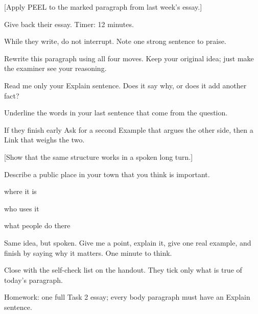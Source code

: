 \documentclass{tutordesk}
\begin{document}
[Apply PEEL to the marked paragraph from last week's essay.]

\begin{action}
  \item Give back their essay. Timer: 12 minutes.
  \item While they write, do not interrupt. Note one strong sentence to praise.
\end{action}

\begin{say}
Rewrite this paragraph using all four moves. Keep your original idea; just make the examiner
see your reasoning.
\end{say}

\begin{probe}
  \item Read me only your Explain sentence. Does it say why, or does it add another fact?
  \item Underline the words in your last sentence that come from the question.
\end{probe}

\begin{fallback}{If they finish early}
Ask for a second Example that argues the other side, then a Link that weighs the two.
\end{fallback}

[Show that the same structure works in a spoken long turn.]

\begin{cuecard}{Describe a public place in your town that you think is important.}
  \item where it is
  \item who uses it
  \item what people do there
\end{cuecard}

\begin{say}
Same idea, but spoken. Give me a point, explain it, give one real example, and finish by
saying why it matters. One minute to think.
\end{say}

\begin{action}
  \item Close with the self-check list on the handout. They tick only what is true of today's paragraph.
  \item Homework: one full Task 2 essay; every body paragraph must have an Explain sentence.
\end{action}
\end{document}
